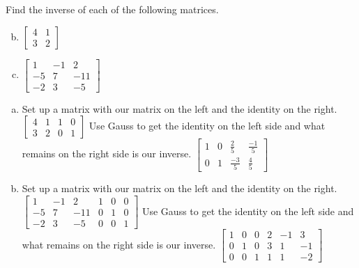 \documentclass[../main.tex]{subfiles}
\begin{document}
Find the inverse of each of the following matrices.
\begin{enumerate}[a)]
	\setcounter{enumi}{1}
	\item 
		$\left[\begin{array}{rr}
			4 & 1 \\
			3 & 2
		\end{array}\right]$
	\setcounter{enumi}{3}
	\item 
		$\left[\begin{array}{rrr}
			1 & -1 & 2 \\
			-5 & 7 & -11 \\
			-2 & 3 & -5
		\end{array}\right]$
\end{enumerate}


\solution

\begin{enumerate}[a)]
    \item
        Set up a matrix with our matrix on the left and the identity on the right. 
		$\left[\begin{array}{rr|rr}
			4 & 1 & 1 & 0 \\
			3 & 2 & 0 & 1
		\end{array}\right]$
        Use Gauss to get the identity on the left side and what remains on the right side is our inverse. 
		$\left[\begin{array}{rr|rr}
			1 & 0 & \frac{2}{5} & \frac{-1}{5} \\
			0 & 1 & \frac{-3}{5} & \frac{4}{5}
		\end{array}\right]$
    \setcounter{enumi}{3}
	\item 
        Set up a matrix with our matrix on the left and the identity on the right.
		$\left[\begin{array}{rrr|rrr}
			1 & -1 & 2 & 1 & 0 & 0 \\
			-5 & 7 & -11 & 0 & 1 & 0\\
			-2 & 3 & -5 & 0 & 0 & 1
		\end{array}\right]$
        Use Gauss to get the identity on the left side and what remains on the right side is our inverse.
		$\left[\begin{array}{rrr|rrr}
			1 & 0 & 0 & 2 & -1 & 3 \\
			0 & 1 & 0 & 3 & 1 & -1\\
			0 & 0 & 1 & 1 & 1 & -2
		\end{array}\right]$
\end{enumerate}
\end{document}
